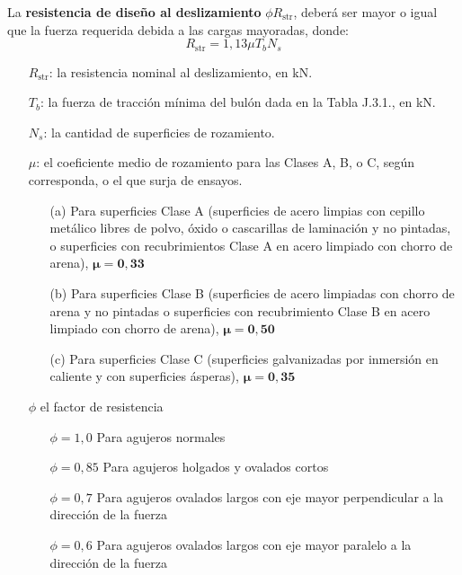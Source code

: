 \documentclass[twocolumn]{article}
\newcommand{\str}{\text{str}}
\begin{document}
La\textbf{ resistencia de diseño al deslizamiento} $\phi R_\str$, deberá ser mayor o igual que la fuerza requerida debida a las cargas mayoradas, donde:
\[
R_{\str} = 1,13 \mu T_b N_s
\]

\begin{itemize}
	\item[$R_{\str}$:] la resistencia nominal al deslizamiento, en kN.
	\item[$T_b$:] la fuerza de tracción mínima del bulón dada en la Tabla J.3.1., en kN.
	\item[$N_s$:] la cantidad de superficies de rozamiento.
	\item[$\mu$:] el coeficiente medio de rozamiento para las Clases A, B, o C, según	corresponda, o el que surja de ensayos.
	\begin{itemize}
		\item[(a)] Para superficies Clase A (superficies de acero limpias con cepillo	metálico libres de polvo, óxido o cascarillas de laminación y no pintadas, o superficies con recubrimientos Clase A en acero limpiado con chorro de arena), $\mathbf{\mu=0,33}$
		\item[(b)] Para superficies Clase B (superficies de acero limpiadas con chorro de arena y no pintadas o superficies con recubrimiento Clase B en acero limpiado con chorro de arena), $\mathbf{\mu=0,50}$
		\item[(c)] Para superficies Clase C (superficies galvanizadas por inmersión en caliente y con superficies ásperas), $\mathbf{\mu=0,35}$
	\end{itemize}
\item[$\phi$] el factor de resistencia
\begin{itemize}
	\item[$\phi=1,0$] Para agujeros normales
	\item[$\phi=0,85$] 	Para agujeros holgados y ovalados cortos
	\item[$\phi=0,7$] Para agujeros ovalados largos con eje mayor perpendicular a la dirección de la fuerza
	\item[$\phi=0,6$] Para agujeros ovalados largos con eje mayor paralelo a la dirección de la fuerza
\end{itemize}
\end{itemize}
\end{document}
